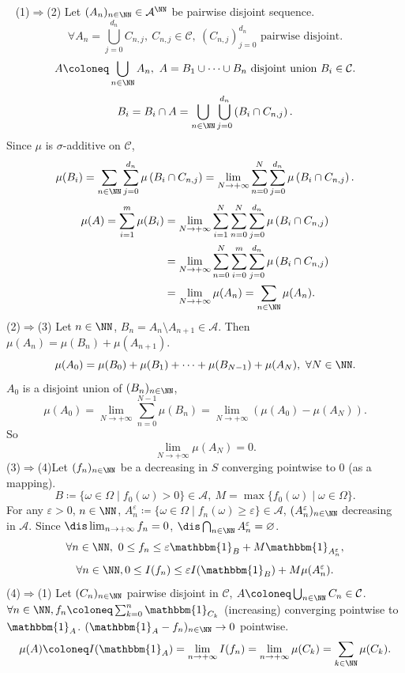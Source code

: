 \begin{proofenv}
    \ \newline
    (1)$\Rightarrow$(2) Let $(A_n)_{n\in\NN}\in \mathcal{A}^\NN$ be pairwise disjoint sequence. 
    $$ \forall A_n=\bigcup_{j=0}^{d_n}C_{n,j},\ C_{n,j}\in \mathcal{C},\ (C_{n,j})_{j=0}^{d_n}\text{ pairwise disjoint.}$$
    $$ A\coloneq \bigcup_{n\in\NN} A_n,\ A=B_1\cup \cdots\cup B_n \text{ disjoint union } B_{i}\in \mathcal{C}.$$
    $$ B_i =B_i \cap A =\bigcup_{n\in\NN} \bigcup_{j=0}^{d_n} \left( B_i \cap C_{n,j}\right).$$
    Since $\mu$ is $\sigma$-additive on $\mathcal{C}$,
    $$ \mu(B_i)=\sum_{n\in\NN}\sum_{j=0}^{d_n} \mu \left(B_i\cap C_{n,j}\right)=\lim_{N\rightarrow +\infty} \sum_{n=0}^{N}\sum_{j=0}^{d_n}\mu\left(B_i\cap C_{n,j}\right).$$
    \begin{align*}
        \mu(A)=\sum_{i=1}^{m}\mu(B_i) &=\lim_{N\rightarrow +\infty} \sum_{i=1}^{N}\sum_{n=0}^{N}\sum_{j=0}^{d_n} \mu\left(B_i\cap C_{n,j}\right)\\
        &=\lim_{N\rightarrow +\infty} \sum_{n=0}^{N}\sum_{i=0}^{m}\sum_{j=0}^{d_n}\mu\left(B_i\cap C_{n,j}\right)\\
        &= \lim_{N\rightarrow +\infty} \mu(A_n)=\sum_{n\in\NN}\mu(A_n).
    \end{align*}
    (2)$\Rightarrow$(3) Let $n\in\NN$, $B_n=A_n\setminus A_{n+1}\in \mathcal{A}$. Then $\mu(A_n)=\mu(B_n)+\mu(A_{n+1})$.
    $$ \mu(A_0)=\mu(B_0)+\mu(B_1)+\cdots+\mu(B_{N-1})+\mu(A_N),\ \forall N\in \NN.$$
    $A_0$ is a disjoint union of $(B_n)_{n\in\NN}$,
    $$\mu(A_0)=\lim_{N\rightarrow +\infty} \sum_{n=0}^{N-1}\mu(B_n)=\lim_{N\rightarrow +\infty}\left(\mu(A_0)-\mu(A_N)\right).$$
    So 
    $$ \lim_{N\rightarrow +\infty} \mu(A_N)=0.$$
    (3)$\Rightarrow$(4)Let  $(f_n)_{n\in\NN}$ be a decreasing in $S$ converging pointwise to $0$ (as a mapping).
    $$ B\coloneq \{\omega\in \Omega \mid f_0 (\omega )>0\}\in \mathcal{A},\ M=\max\{f_0(\omega)\mid \omega\in \Omega\}.$$
    For any $\varepsilon>0$, $n\in\NN$, $A_n^\varepsilon\coloneq\{\omega\in \Omega\mid f_n(\omega)\ge\varepsilon\}\in\mathcal{A}$, $(A_n^\varepsilon)_{n\in\NN}$ decreasing in $\mathcal{A}$. Since $\dis \lim_{n\rightarrow +\infty}f_n=0$, $\dis \bigcap_{n\in\NN}A_n^\varepsilon=\varnothing$. 
    $$ \forall n\in\NN, \ 0\le f_n\le \varepsilon \mathbbm{1}_B +M \mathbbm{1}_{A_n^\varepsilon},$$
    $$ \forall n\in\NN, 0\le I(f_n)\le \varepsilon I(\mathbbm{1}_B)+M\mu(A_n^\varepsilon).$$
    (4)$\Rightarrow$(1) Let $(C_n)_{n\in\NN}$ pairwise disjoint in $\mathcal{C}$, $A\coloneq \bigcup_{n\in\NN}C_n\in \mathcal{C}$.
    $\forall n\in \NN, f_n\coloneq \sum_{k=0}^{n}\mathbbm{1}_{C_k}$ (increasing) converging pointwise to $\mathbbm{1}_A$. $(\mathbbm{1}_A-f_n)_{n\in\NN}\rightarrow 0$ pointwise.
    $$ \mu(A)\coloneq I(\mathbbm{1}_A)=\lim_{n\rightarrow +\infty} I(f_n)=\lim_{n\rightarrow +\infty} \mu(C_k)=\sum_{k\in \NN}\mu(C_k).$$
\end{proofenv}
